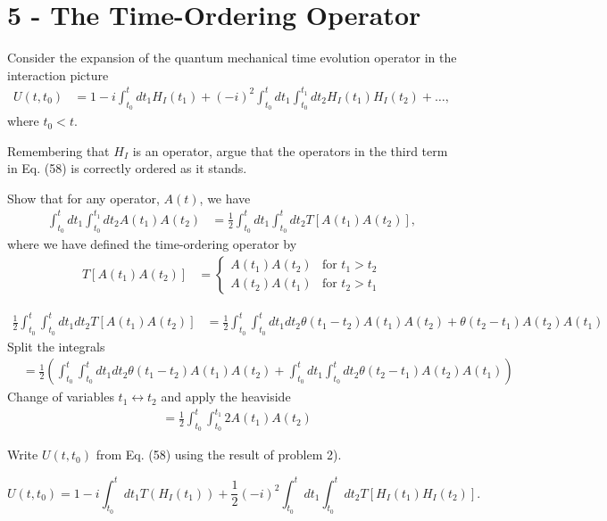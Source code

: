 \documentclass[working, oneside]{../../Preambles/tuftebook}
\begin{document}
\let\cleardoublepage\clearpage
\thispagestyle{fancy}
\chapter{5 - The Time-Ordering Operator}

Consider the expansion of the quantum mechanical time evolution operator in the interaction picture
\begin{align*}
U(t, t_0)
&= 1 - i \int_{t_0}^t dt_1 H_I(t_1) + (-i)^2 \int_{t_0}^t dt_1 \int_{t_0}^{t_1} dt_2 H_I(t_1) H_I(t_2) + \dots, \tag{58}
\end{align*}
where \( t_0 < t \).

\begin{exercise}[1]
Remembering that \( H_I \) is an operator, argue that the operators in the third term in Eq. (58) is correctly ordered as it stands.
\end{exercise}

\begin{exercise}[2]
Show that for any operator, \( A(t) \), we have
\begin{align*}
\int_{t_0}^t dt_1 \int_{t_0}^{t_1} dt_2 A(t_1) A(t_2)
&= \frac{1}{2} \int_{t_0}^t dt_1 \int_{t_0}^t dt_2 T[A(t_1) A(t_2)], \tag{59}
\end{align*}
where we have defined the time-ordering operator by
\begin{align*}
T[A(t_1) A(t_2)]
&= \begin{cases}
A(t_1) A(t_2) & \text{for } t_1 > t_2 \\
A(t_2) A(t_1) & \text{for } t_2 > t_1
\end{cases} \tag{60}
\end{align*}
\end{exercise}
\begin{solution}
\begin{align*}
\frac{1}{2} \int_{t_0}^t \int_{t_0}^t dt_1 dt_2 T[A(t_1) A(t_2)]
&= \frac{1}{2} \int_{t_0}^t \int_{t_0}^t dt_1 dt_2 \theta(t_1 - t_2) A(t_1) A(t_2) + \theta(t_2 - t_1) A(t_2) A(t_1)
\end{align*}
Split the integrals
\begin{align*}
&= \frac{1}{2} \left( \int_{t_0}^t \int_{t_0}^{t} dt_1 dt_2 \theta(t_1 - t_2) A(t_1) A(t_2) + \int_{t_0}^t dt_1\int_{t_0}^{t}dt_2 \theta(t_2 - t_1) A(t_2) A(t_1) \right)
\end{align*}
Change of variables \( t_1 \leftrightarrow t_2 \) and apply the heaviside
\begin{align*}
&= \frac{1}{2} \int_{t_0}^t \int_{t_0}^{t_1} 2 A(t_1) A(t_2)
\end{align*}
\end{solution}
\begin{exercise}[3]
Write \( U(t, t_0) \) from Eq. (58) using the result of problem 2).
\end{exercise}
\begin{solution}
    \[
    U\left( t, t_0 \right) = 1 -i \int ^{t}_{t_0}dt_1 T\left( H_I\left( t_1 \right)  \right) + \frac{1}{2} \left( -i \right) ^2 \int ^{t}_{t_0}dt_1 \int ^{t}_{t_0}dt_2T\left[ H_I\left( t_1 \right) H_I\left( t_2 \right)  \right] 
    .\] 
\end{solution}
\end{document}
